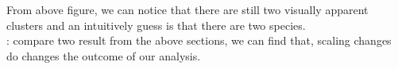 From above figure, we can notice that there are still two visually apparent clusters and an intuitively guess is that there are two species.\\

: compare two result from the above sections, we can find that, scaling changes do changes the outcome of our analysis.


\newpage


\clearpage

%
%
%



